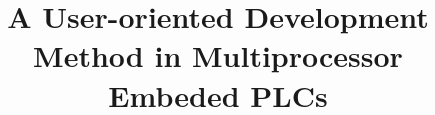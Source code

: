 \documentclass[journal,UTF8]{IEEEtran}
\begin{document}
%
\title{A User-oriented Development Method in Multiprocessor Embeded PLCs}
%
%
%


%
%
\end{document}
